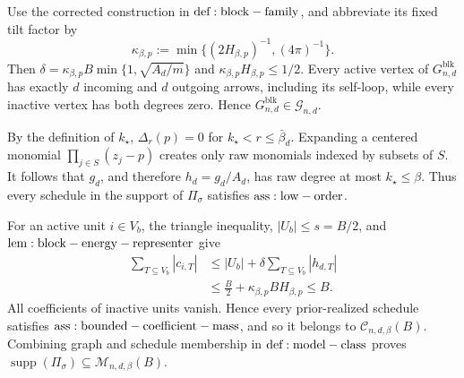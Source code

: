 Use the corrected construction in \({\rm def:block-family}\), and abbreviate its fixed tilt factor by
\[
\kappa_{\beta,p}:=\min\{(2H_{\beta,p})^{-1},(4\pi)^{-1}\}.
\]
Then \(\delta=\kappa_{\beta,p}B\min\{1,\sqrt{A_d/m}\}\) and \(\kappa_{\beta,p}H_{\beta,p}\le1/2\). Every active vertex of \(G_{n,d}^{\mathrm{blk}}\) has exactly \(d\) incoming and \(d\) outgoing arrows, including its self-loop, while every inactive vertex has both degrees zero. Hence \(G_{n,d}^{\mathrm{blk}}\in\mathcal G_{n,d}\).

By the definition of \(k_\star\), \(\Delta_r(p)=0\) for \(k_\star<r\le\bar\beta_d\). Expanding a centered monomial \(\prod_{j\in S}(z_j-p)\) creates only raw monomials indexed by subsets of \(S\). It follows that \(g_d\), and therefore \(h_d=g_d/A_d\), has raw degree at most \(k_\star\le\beta\). Thus every schedule in the support of \(\Pi_\sigma\) satisfies \({\rm ass:low-order}\).

For an active unit \(i\in V_b\), the triangle inequality, \(|U_b|\le s=B/2\), and \({\rm lem:block-energy-representer}\) give
\[
\begin{aligned}
\sum_{T\subseteq V_b}|c_{i,T}|
&\le |U_b|+\delta\sum_{T\subseteq V_b}|h_{d,T}|\\
&\le \frac B2+\kappa_{\beta,p}BH_{\beta,p}\le B.
\end{aligned}
\]
All coefficients of inactive units vanish. Hence every prior-realized schedule satisfies \({\rm ass:bounded-coefficient-mass}\), and so it belongs to \(\mathcal C_{n,d,\beta}(B)\). Combining graph and schedule membership in \({\rm def:model-class}\) proves \(\operatorname{supp}(\Pi_\sigma)\subseteq\mathcal M_{n,d,\beta}(B)\).
